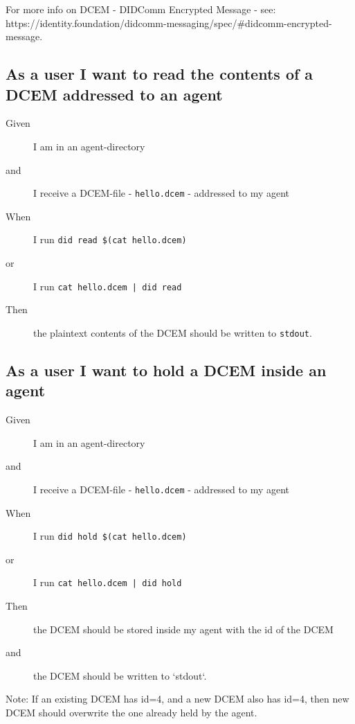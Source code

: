 For more info on DCEM - DIDComm Encrypted Message - see: https://identity.foundation/didcomm-messaging/spec/#didcomm-encrypted-message.



\subsection{As a user I want to read the contents of a DCEM addressed to an agent}
\begin{description}\begin{description}
    \item[Given] I am in an agent-directory
    \item[and] I receive a DCEM-file - \texttt{hello.dcem} - addressed to my agent
    \item[When] I run \texttt{did read \$(cat hello.dcem)} 
    \item[or] I run \texttt{cat hello.dcem | did read}
    \item[Then] the plaintext contents of the DCEM should be written to \texttt{stdout}.
\end{description}\end{description}



\subsection{As a user I want to hold a DCEM inside an agent}
\begin{description}\begin{description}
    \item[Given] I am in an agent-directory
    \item[and] I receive a DCEM-file - \texttt{hello.dcem} - addressed to my agent
    \item[When] I run \texttt{did hold \$(cat hello.dcem)} 
    \item[or] I run \texttt{cat hello.dcem | did hold}
    \item[Then] the DCEM should be stored inside my agent with the id of the DCEM
    \item[and] the DCEM should be written to `stdout`.
\end{description}\end{description}

Note: If an existing DCEM has id=4, and a new DCEM also has id=4, then new DCEM should overwrite the one already held by the agent.




